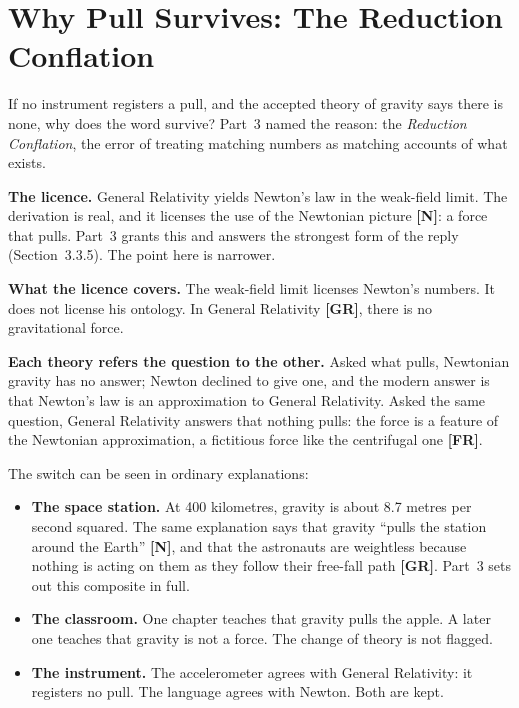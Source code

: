 \documentclass[11pt,a4paper]{article}
\newcommand{\reg}[1]{\textsf{\small\textbf{[#1]}}}
\newcommand{\RN}{\reg{N}}
\newcommand{\RGR}{\reg{GR}}
\newcommand{\RFR}{\reg{FR}}
\begin{document}
\section{Why Pull Survives: The Reduction Conflation}
\label{sec:rc}

If no instrument registers a pull, and the accepted theory of gravity says there is none, why does the word survive? Part~3 named the reason: the \emph{Reduction Conflation}, the error of treating matching numbers as matching accounts of what exists.

\textbf{The licence.} General Relativity yields Newton's law in the weak-field limit. The derivation is real, and it licenses the use of the Newtonian picture \RN{}: a force that pulls. Part~3 grants this and answers the strongest form of the reply (Section~3.3.5). The point here is narrower.

\textbf{What the licence covers.} The weak-field limit licenses Newton's numbers. It does not license his ontology. In General Relativity \RGR{}, there is no gravitational force. 

\textbf{Each theory refers the question to the other.} Asked what pulls, Newtonian gravity has no answer; Newton declined to give one, and the modern answer is that Newton's law is an approximation to General Relativity. Asked the same question, General Relativity answers that nothing pulls: the force is a feature of the Newtonian approximation, a fictitious force like the centrifugal one \RFR{}. 

The switch can be seen in ordinary explanations:
\begin{itemize}
  \item \textbf{The space station.} At 400 kilometres, gravity is about 8.7 metres per second squared. The same explanation says that gravity ``pulls the station around the Earth'' \RN{}, and that the astronauts are weightless because nothing is acting on them as they follow their free-fall path \RGR{}. Part~3 sets out this composite in full.
  \item \textbf{The classroom.} One chapter teaches that gravity pulls the apple. A later one teaches that gravity is not a force. The change of theory is not flagged.
  \item \textbf{The instrument.} The accelerometer agrees with General Relativity: it registers no pull. The language agrees with Newton. Both are kept.
\end{itemize}
\end{document}
